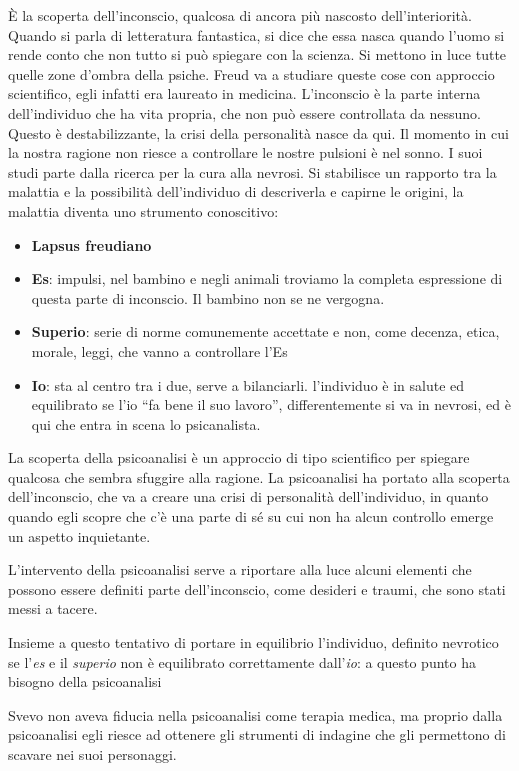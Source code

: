 \documentclass[a4paper, twoside, titlepage]{book}
\newcommand{\elenco}[1]{%
\begin{itemize}
#1
\end{itemize}}
\begin{document}
È la scoperta dell’inconscio, qualcosa di ancora più nascosto dell’interiorità.
Quando si parla di letteratura fantastica, si dice che essa nasca quando l’uomo si rende conto che non tutto si può spiegare con la scienza. Si mettono in luce tutte quelle zone d’ombra della psiche.
Freud va a studiare queste cose con approccio scientifico, egli infatti era laureato in medicina.
L’inconscio è la parte interna dell’individuo che ha vita propria, che non può essere controllata da nessuno. Questo è destabilizzante, la crisi della personalità nasce da qui.
Il momento in cui la nostra ragione non riesce a controllare le nostre pulsioni è nel sonno.
I suoi studi parte dalla ricerca per la cura alla nevrosi. Si stabilisce un rapporto tra la malattia e la possibilità dell’individuo di descriverla e capirne le origini, la malattia diventa uno strumento conoscitivo:

\elenco{\item \textbf{Lapsus freudiano}
\item \textbf{Es}: impulsi, nel bambino e negli animali troviamo la completa espressione di questa parte di inconscio. Il bambino non se ne vergogna.
\item \textbf{Superio}: serie di norme comunemente accettate e non, come decenza, etica, morale, leggi, che vanno a controllare l’Es
\item \textbf{Io}: sta al centro tra i due, serve a bilanciarli. l’individuo è in salute ed equilibrato se l’io “fa bene il suo lavoro”, differentemente si va in nevrosi, ed è qui che entra in scena lo psicanalista.
}

La scoperta della psicoanalisi è un approccio di tipo scientifico per spiegare qualcosa che sembra sfuggire alla ragione. La psicoanalisi ha portato alla scoperta dell'inconscio, che va a creare una crisi di personalità dell'individuo, in quanto quando egli scopre che c'è una parte di sé su cui non ha alcun controllo emerge un aspetto inquietante.

L'intervento della psicoanalisi serve a riportare alla luce alcuni elementi che possono essere definiti parte dell'inconscio, come desideri e traumi, che sono stati messi a tacere.

Insieme a questo tentativo di portare in equilibrio l'individuo, definito nevrotico se l'\textit{es} e il \textit{superio} non è equilibrato correttamente dall'\textit{io}: a questo punto ha bisogno della psicoanalisi

Svevo non aveva fiducia nella psicoanalisi come terapia medica, ma proprio dalla psicoanalisi egli riesce ad ottenere gli strumenti di indagine che gli permettono di scavare nei suoi personaggi.
\end{document}
